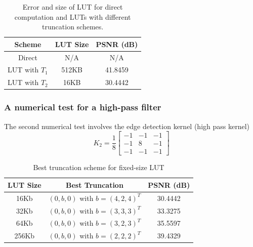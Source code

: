 \documentclass[12pt]{amsart}
\theoremstyle{definition}
\theoremstyle{remark}
\numberwithin{thm}{section}
\begin{document}
\begin{center}
\begin{table}
	 
    \begin{tabular}{ | c | c| c |}
    \hline
    Scheme & LUT Size & PSNR (dB) \\ \hline
    Direct & N/A & N/A  \\ \hline
    LUT with $T_1$ & 512KB & 41.8459 \\ \hline
    LUT with $T_2$ & 16KB & 30.4442 \\ \hline   
    \end{tabular}
    \bigskip
    
    \caption{Error and size of LUT for direct computation and LUTs with different truncation schemes.}
    \label{tbl:low_pass}
\end{table} 
\end{center}

\subsubsection{A numerical test for a high-pass filter}

The second numerical test involves the edge detection kernel (high pass kernel)
$$
K_2=\frac{1}{8}
\begin{bmatrix}
-1 & -1 & -1\\
-1 &  8 & -1\\
-1 & -1 & -1
\end{bmatrix}
$$
\begin{center}
\begin{table}
	
    \begin{tabular}{ | c | c | c | }
    \hline
    LUT Size & Best Truncation & PSNR (dB) \\ \hline
    16Kb& $(0,b,0)$ with $b=(4,2,4)^T$ & 30.4442 \\ \hline
    32Kb& $(0,b,0)$ with $b=(3,3,3)^T$ & 33.3275 \\ \hline 
    64Kb& $(0,b,0)$ with $b=(3,2,3)^T$ & 35.5597 \\ \hline 
    256Kb& $(0,b,0)$ with $b=(2,2,2)^T$ & 39.4329 \\ \hline 
    \end{tabular}
    \bigskip
    
    \caption{Best truncation scheme for fixed-size LUT}
    \label{tbl:optimization}
\end{table} 
\end{center}
\end{document}

